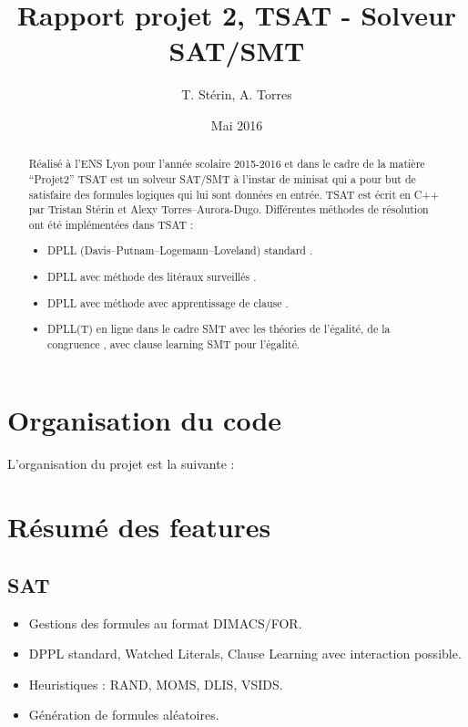 \documentclass{article}
\title{Rapport projet 2, TSAT - Solveur SAT/SMT}
\author{T. Stérin, A. Torres}
\date{Mai 2016}
\newcommand{\litt}{\alpha}
\newcommand{\non}[1]{\overline{#1}}
\begin{document}
\maketitle

\begin{abstract}
Réalisé à l'ENS Lyon pour l'année scolaire 2015-2016 et dans le cadre de la matière ``Projet2'' TSAT est un solveur SAT/SMT à l'instar de minisat \cite{minisat} qui a pour but de satisfaire des formules logiques qui lui sont données en entrée.
TSAT est écrit en C++ par Tristan Stérin et Alexy Torres--Aurora-Dugo.
Différentes méthodes de résolution ont été implémentées dans TSAT : 
\begin{itemize}
	\item DPLL (Davis–Putnam–Logemann–Loveland) standard \cite{DPLL}.
	\item DPLL avec méthode des litéraux surveillés \cite{WL}.
	\item DPLL avec méthode avec apprentissage de clause \cite{CL}.
	\item DPLL(T) en ligne dans le cadre SMT avec les théories de l'égalité, de la congruence \cite{SMT}, avec clause learning SMT pour l'égalité. 
\end{itemize}
\end{abstract}

\section{Organisation du code}
L'organisation du projet est la suivante :
\newpage

\section{Résumé des features}
\subsection{SAT}
\begin{itemize}
\item Gestions des formules au format DIMACS/FOR.
\item DPPL standard, Watched Literals, Clause Learning avec interaction possible.
\item Heuristiques : RAND, MOMS, DLIS, VSIDS.
\item Génération de formules aléatoires.
\end{itemize}
\end{document}
